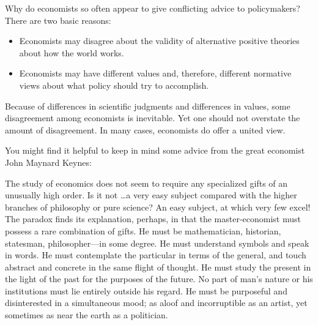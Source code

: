 Why do economists so often appear to give conflicting advice to policymakers?
There are two basic reasons:
\begin{itemize}
\item Economists may disagree about the validity of alternative positive theories about how the world works.
\item Economists may have different values and, therefore, different normative views about what policy should try to accomplish.
\end{itemize}


Because of differences in scientific judgments and differences in values, some disagreement among economists is inevitable.
Yet one should not overstate the amount of disagreement.
In many cases, economists do offer a united view.


You might find it helpful to keep in mind some advice from the great economist John Maynard Keynes:

\begin{tcolorbox}
The study of economics does not seem to require any specialized gifts of an unusually high order. Is it not \dots a very easy subject compared with the higher branches of philosophy or pure science? An easy subject, at which very few excel! The paradox finds its explanation, perhaps, in that the master-economist must possess a rare combination of gifts. He must be mathematician, historian, statesman, philosopher—in some degree. He must understand symbols and speak in words. He must contemplate the particular in terms of the general, and touch abstract and concrete in the same flight of thought. He must study the present in the light of the past for the purposes of the future. No part of man’s nature or his institutions must lie entirely outside his regard. He must be purposeful and disinterested in a simultaneous mood; as aloof and incorruptible as an artist, yet sometimes as near the earth as a politician.
\end{tcolorbox}

